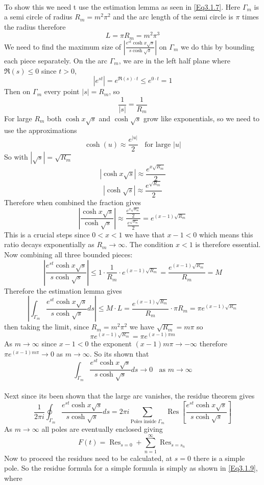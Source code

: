 \\
To show this we need t use the estimation lemma as seen in \ref{Eq3.1.7}. Here $\Gamma_{m}$ is a semi circle of radius $R_m=m^2\pi^2$ and the arc length of the semi circle is $\pi$ times the radius therefore $$L=\pi R_m=m^2\pi^3$$ 
We need to find the maximum size of $\left|\frac{e^{st}\cosh x\sqrt{s}}{s\cosh \sqrt{s}}\right|$ on $\Gamma_m$ we do this by bounding each piece separately. 
On the arc $\Gamma_m$, we are in the left half plane where $\Re(s)\leq0$ since $t>0$, $$|e^{st}|=e^{\Re(s)\cdot t}\leq e^{0\cdot t}=1$$
Then on $\Gamma_m$ every point $|s|=R_m$, so $$\frac{1}{|s|}=\frac{1}{R_m}$$ For large $R_m$ both $\cosh x\sqrt{s}$ and $\cosh \sqrt{s}$ grow like exponentials, so we need to use the approximations $$\cosh(u)\approx \frac{e^{|u|}}{2} \ \ \ \ \text{for large }|u|$$ So with $|\sqrt{s}|=\sqrt{R_m}$ $$|\cosh x\sqrt{s}|\approx\frac{e^{x\sqrt{R_m}}}{2}$$ $$|\cosh \sqrt{s}|\approx\frac{e^{\sqrt{R_m}}}{2}$$ Therefore when combined the fraction gives $$\left|\frac{\cosh x\sqrt{s}}{\cosh\sqrt{s}}\right|\approx\frac{\frac{e^{x\sqrt{R_m}}}{2}}{\frac{e^{\sqrt{R_m}}}{2}}=e^{(x-1)\sqrt{R_m}}$$ 
This is a crucial steps since $0<x<1$ we have that $x-1<0$ which means this ratio decays exponentially as $R_m\to\infty$. The condition $x<1$ is therefore essential. Now combining all three bounded pieces: 
$$\left|\frac{e^{st}\cosh x\sqrt{s}}{s \cosh \sqrt{s}}\right|\leq 1\cdot\frac{1}{R_m}\cdot e^{(x-1)\sqrt{R_m}}=\frac{e^{(x-1)\sqrt{R_m}}}{R_m}=M$$ 
Therefore the estimation lemma gives $$\left|\int_{\Gamma_m}\frac{e^{st}\cosh x\sqrt{s}}{s \cosh \sqrt{s}}ds\right|\leq M\cdot L=\frac{e^{(x-1)\sqrt{R_m}}}{R_m}\cdot \pi R_m=\pi e^{(x-1)\sqrt{R_m}}$$ then taking the limit, since $R_m=m^2\pi^2$ we have $\sqrt{R_m}=m\pi$ so $$\pi e^{(x-1)\sqrt{R_m}}=\pi e^{(x-1)\pi m}$$ 
As $m\to\infty$ since $x-1<0$ the exponent $(x-1)m\pi\to -\infty$ therefore $\pi e^{(x-1)m\pi}\to0$ as $m\to\infty$. So its shown that 
$$\int_{\Gamma_m}\frac{e^{st}\cosh x\sqrt{s}}{s \cosh \sqrt{s}}ds \to 0 \ \ \ \ \text{as } m\to\infty$$
\\
Next since its been shown that the large arc vanishes, the residue theorem gives $$\frac{1}{2\pi i}\oint_{\Gamma_m}\frac{e^{st}\cosh x\sqrt{s}}{s\cosh\sqrt{s}}ds= 2\pi i\sum_{\text{Poles inside } \Gamma_m}\operatorname{Res}\left[\frac{e^{st}\cosh x\sqrt{s}}{s\cosh\sqrt{s}}\right]$$ As $m\to\infty$ all poles are eventually enclosed giving $$F(t)=\operatorname{Res}_{s=0}+\sum^{\infty}_{n=1}\operatorname{Res}_{s=s_n}$$
Now to proceed the residues need to be calculated, at $s=0$ there is a simple pole. So the residue formula for a simple formula is simply as shown in \ref{Eq3.1.9}, where 
